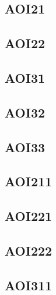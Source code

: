 \documentclass[10pt,a4paper,twoside]{article}
\begin{document}

\subsection{AOI21}

\clearpage

\subsection{AOI22}

\clearpage

\subsection{AOI31}

\clearpage

\subsection{AOI32}

\clearpage

\subsection{AOI33}

\clearpage

\subsection{AOI211}

\clearpage

\subsection{AOI221}

\clearpage

\subsection{AOI222}

\clearpage

\subsection{AOI311}

\clearpage
\end{document}
